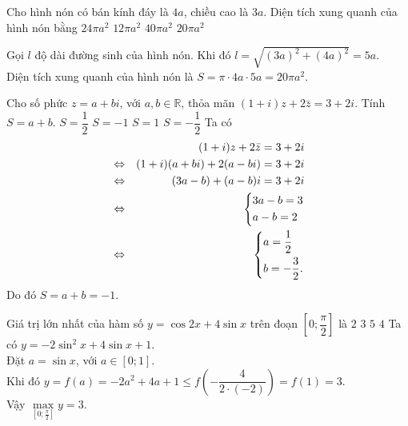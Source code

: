 \begin{ex}%
 Cho hình nón có bán kính đáy là $4a$, chiều cao là $3a$. Diện tích xung quanh của hình nón bằng
 \choice
  {$24\pi a^2$}
  {$12\pi a^2$}
  {$40\pi a^2$}
  {\True $20\pi a^2$}
 \loigiai
  {
  \immini
  {
  Gọi $l$ độ dài đường sinh của hình nón. Khi đó $l=\sqrt{ (3a)^2+(4a)^2}=5a$.\\
  Diện tích xung quanh của hình nón là $S=\pi\cdot 4a\cdot 5a=20\pi a^2$.
  }
  {
  } 
  }
\end{ex}

\begin{ex}%
 Cho số phức $z=a+bi$, với $a,b\in\mathbb{R}$, thỏa mãn $(1+i)z+2\bar{z}=3+2i$. Tính $S=a+b$.
 \choice
  {$S=\dfrac{1}{2}$}
  {\True $S=-1$}
  {$S=1$}
  {$S=-\dfrac{1}{2}$}
 \loigiai
  {
  Ta có
  \allowdisplaybreaks
  \begin{eqnarray*}
  	&& (1+i)z+2\bar{z}=3+2i\\
  	&\Leftrightarrow &(1+i)(a+bi)+2(a-bi)=3+2i\\
  	&\Leftrightarrow &(3a-b)+(a-b)i=3+2i\\
  	&\Leftrightarrow &\left\{\begin{aligned}&3a-b=3\\&a-b=2\end{aligned}\right.\\
  	&\Leftrightarrow &\left\{\begin{aligned}&a=\dfrac{1}{2}\\&b=-\dfrac{3}{2}.\end{aligned}\right.
  \end{eqnarray*}
  Do đó $S=a+b=-1$.
  }
\end{ex}

\begin{ex}%
 Giá trị lớn nhất của hàm số $y=\cos2x+4\sin x$ trên đoạn $\left[0;\dfrac{\pi}{2}\right]$ là
 \choice
  {$2$}
  {\True $3$}
  {$5$}
  {$4$}
 \loigiai
  {
  Ta có $y=-2\sin^2 x+4\sin x+1$.\\
  Đặt $a=\sin x$, với $a\in[0;1]$.\\
  Khi đó $y=f(a)=-2a^2+4a+1\le f\left(-\dfrac{4}{2\cdot (-2)}\right)=f(1)=3$.\\
  Vậy $\max\limits_{\left[0;\frac{\pi}{2}\right]} y=3$.
  }
\end{ex}

